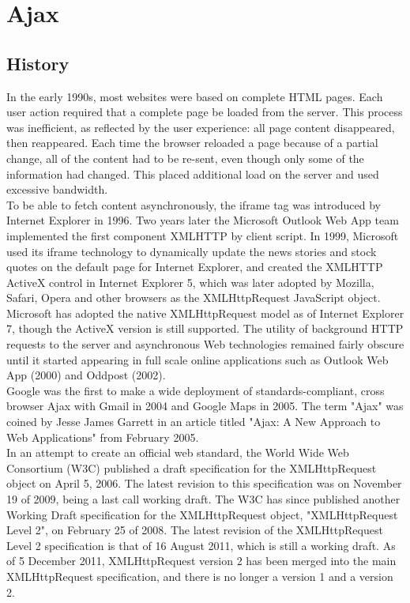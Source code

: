 \section{Ajax}
	
\subsection{History}
In the early 1990s, most websites were based on complete HTML pages. Each user action required that a complete page be loaded from the server. This process was inefficient, as reflected by the user experience: all page content disappeared, then reappeared. Each time the browser reloaded a page because of a partial change, all of the content had to be re-sent, even though only some of the information had changed. This placed additional load on the server and used excessive bandwidth.\\
	
To be able to fetch content asynchronously, the iframe tag was introduced by Internet Explorer in 1996. Two years later the Microsoft Outlook Web App team implemented the first component XMLHTTP by client script.
In 1999, Microsoft used its iframe technology to dynamically update the news stories and stock quotes on the default page for Internet Explorer, and created the XMLHTTP ActiveX control in Internet Explorer 5, which was later adopted by Mozilla, Safari, Opera and other browsers as the XMLHttpRequest JavaScript object. Microsoft has adopted the native XMLHttpRequest model as of Internet Explorer 7, though the ActiveX version is still supported. The utility of background HTTP requests to the server and asynchronous Web technologies remained fairly obscure until it started appearing in full scale online applications such as Outlook Web App (2000) and Oddpost (2002).\\
	
Google was the first to make a wide deployment of standards-compliant, cross browser Ajax with Gmail in 2004 and Google Maps in 2005. The term "Ajax" was coined by Jesse James Garrett in an article titled "Ajax: A New Approach to Web Applications" from February 2005.\\
	
In an attempt to create an official web standard, the World Wide Web Consortium (W3C) published a draft specification for the XMLHttpRequest object on April 5, 2006. The latest revision to this specification was on November 19 of 2009, being a last call working draft. The W3C has since published another Working Draft specification for the XMLHttpRequest object, "XMLHttpRequest Level 2", on February 25 of 2008. The latest revision of the XMLHttpRequest Level 2 specification is that of 16 August 2011, which is still a working draft. As of 5 December 2011, XMLHttpRequest version 2 has been merged into the main XMLHttpRequest specification, and there is no longer a version 1 and a version 2.
		
